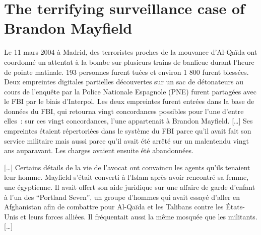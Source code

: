 \section{The terrifying surveillance case of Brandon Mayfield}

Le 11 mars 2004 à Madrid, des terroristes proches de la mouvance d'Al-Qaïda ont coordonné un attentat à la bombe sur plusieurs trains de banlieue durant l'heure de pointe matinale. 193 personnes furent tuées et environ 1 800 furent blessées. Deux empreintes digitales partielles découvertes sur un sac de détonateurs au cours de l'enquête par la Police Nationale Espagnole (PNE) furent partagées avec le FBI par le biais d'Interpol. Les deux empreintes furent entrées dans la base de données du FBI, qui retourna vingt concordances possibles pour l'une d'entre elles : sur ces vingt concordances, l'une appartenait à Brandon Mayfield.
[…]
Ses empreintes étaient répertoriées dans le système du FBI parce qu'il avait fait son service militaire mais aussi parce qu'il avait été arrêté sur un malentendu vingt ans auparavant. Les charges avaient ensuite été abandonnées.

[…] %
Certains détails de la vie de l'avocat ont convaincu les agents qu'ils tenaient leur homme. Mayfield s'était converti à l'Islam après avoir rencontré sa femme, une égyptienne. Il avait offert son aide juridique sur une affaire de garde d'enfant à l'un des \enquote{Portland Seven}, un groupe d'hommes qui avait essayé d'aller en Afghanistan afin de combattre pour Al-Qaïda et les Talibans contre les États-Unis et leurs forces alliées. Il fréquentait aussi la même mosquée que les militants. […] %

